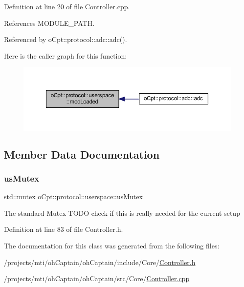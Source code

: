 Definition at line 20 of file Controller.\+cpp.



References M\+O\+D\+U\+L\+E\+\_\+\+P\+A\+TH.



Referenced by o\+Cpt\+::protocol\+::adc\+::adc().

Here is the caller graph for this function\+:\nopagebreak
\begin{figure}[H]
\begin{center}
\leavevmode
\includegraphics[width=350pt]{classo_cpt_1_1protocol_1_1userspace_aac8635fbc254fff76642cf6910484a02_icgraph}
\end{center}
\end{figure}


\subsection{Member Data Documentation}
\hypertarget{classo_cpt_1_1protocol_1_1userspace_a8b03459e89a6ea65ed3f9cd4c38430dd}{}\label{classo_cpt_1_1protocol_1_1userspace_a8b03459e89a6ea65ed3f9cd4c38430dd} 
\subsubsection{\texorpdfstring{us\+Mutex}{usMutex}}
{\footnotesize\ttfamily std\+::mutex o\+Cpt\+::protocol\+::userspace\+::us\+Mutex\hspace{0.3cm}{\ttfamily [protected]}}

The standard Mutex T\+O\+DO check if this is really needed for the current setup 

Definition at line 83 of file Controller.\+h.



The documentation for this class was generated from the following files\+:\begin{DoxyCompactItemize}
\item 
/projects/mti/oh\+Captain/oh\+Captain/include/\+Core/\hyperlink{_controller_8h}{Controller.\+h}\item 
/projects/mti/oh\+Captain/oh\+Captain/src/\+Core/\hyperlink{_controller_8cpp}{Controller.\+cpp}\end{DoxyCompactItemize}
